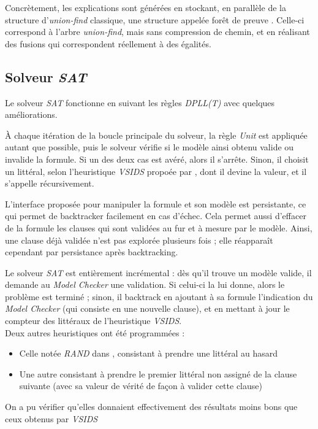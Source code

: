\documentclass[a4paper, 10pt, french]{article}
\newcommand{\foreign}[1]{\emph{#1}}
\begin{document}
Concrètement, les explications sont générées en stockant, en parallèle de la 
structure d'\foreign{union-find} classique, une structure appelée \og forêt de 
preuve \fg. Celle-ci correspond à l'arbre \foreign{union-find}, mais sans 
compression de chemin, et en réalisant des fusions qui correspondent réellement 
à des égalités.


\subsection {Solveur \foreign{SAT}}

Le solveur \foreign{SAT} fonctionne en suivant les règles \foreign{DPLL(T)} avec quelques améliorations.

À chaque itération de la boucle principale du solveur, la règle \foreign{Unit} est appliquée autant que possible, puis le solveur vérifie si le modèle ainsi obtenu valide ou invalide la formule. Si un des deux cas est avéré, alors il s'arrête. Sinon, il choisit un littéral, selon l'heuristique \foreign{VSIDS} propoée par \cite{Chaff}, dont il devine la valeur, et il s'appelle récursivement.

L'interface proposée pour manipuler la formule et son modèle est persistante, ce qui permet de backtracker facilement en cas d'échec. Cela permet aussi d'effacer de la formule les clauses qui sont validées au fur et à mesure par le modèle. Ainsi, une clause déjà validée n'est pas explorée plusieurs fois ; elle réapparaît cependant par persistance après backtracking.

Le solveur \foreign{SAT} est entièrement incrémental : dès qu'il trouve un modèle valide, il demande au \foreign{Model Checker} une validation. Si celui-ci la lui donne, alors le problème est terminé ; sinon, il backtrack en ajoutant à sa formule l'indication du \foreign{Model Checker} (qui consiste en une nouvelle clause), et en mettant à jour le compteur des littéraux de l'heuristique \foreign{VSIDS}.\\

Deux autres heuristiques ont été programmées : \begin{itemize}
	\item Celle notée \foreign{RAND} dans \cite{Chaff}, consistant à prendre une littéral au hasard
	\item Une autre consistant à prendre le premier littéral non assigné de la clause suivante (avec sa valeur de vérité de façon à valider cette clause)
\end{itemize}
On a pu vérifier qu'elles donnaient effectivement des résultats moins bons que ceux obtenus par \foreign{VSIDS}
\end{document}
